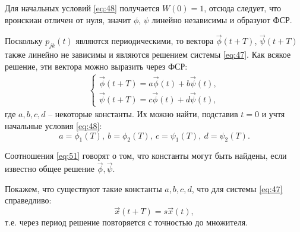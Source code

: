 Для начальных условий \eqref{eq:48} получается $W(0)=1$, отсюда следует, что вронскиан отличен от нуля, значит $\phi$, $\psi$ линейно независимы и образуют ФСР.

Поскольку $p_{jk}(t)$ являются периодическими, то вектора $\vec{\phi}(t+T)$, $\vec{\psi}(t+T)$ также линейно не зависимы и являются решением системы \eqref{eq:47}. Как всякое решение, эти вектора можно выразить через ФСР:
\begin{gather}
	\left\{\begin{aligned}
	\vec{\phi}(t+T)=a\vec{\phi}(t)+b\vec{\psi}(t), \\ 
	\vec{\psi}(t+T)=c\vec{\phi}(t)+d\vec{\psi}(t),			
	\end{aligned}\right.
	\label{eq:50}
\end{gather}
где $a,b,c,d$ -- некоторые константы. Их можно найти, подставив $t=0$ и учтя начальные условия \eqref{eq:48}:
\begin{equation}
	a=\phi_1(T),~ b=\phi_2(T),~ c=\psi_1(T),~ d=\psi_2(T).
	\label{eq:51}	
\end{equation}

Соотношения \eqref{eq:51} говорят о том, что константы могут быть найдены, если известно общее решение $\vec\phi, \vec\psi$.

Покажем, что существуют такие константы $a,b,c,d$, что для системы  \eqref{eq:47} справедливо:
\begin{equation}
	\vec{x}(t+T)=s\vec{x}(t),
	\label{eq:52}	
\end{equation}
т.е. через период решение повторяется с точностью до множителя.


